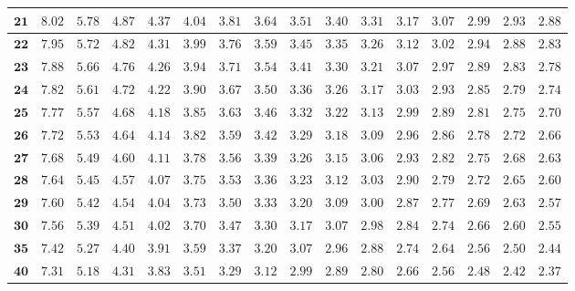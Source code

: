 \begin{alternateColorTable}
\begin{longtable}{|r|r|r|r|r|r|r|r|r|r|r|r|r|r|r|r|}
    \(\mathbf{21}\) & \(8.02\) & \(5.78\) & \(4.87\) & \(4.37\) & \(4.04\) & \(3.81\) & \(3.64\) & \(3.51\) & \(3.40\) & \(3.31\) & \(3.17\) & \(3.07\) & \(2.99\) & \(2.93\) & \(2.88\) \\ \hline 
    \(\mathbf{22}\) & \(7.95\) & \(5.72\) & \(4.82\) & \(4.31\) & \(3.99\) & \(3.76\) & \(3.59\) & \(3.45\) & \(3.35\) & \(3.26\) & \(3.12\) & \(3.02\) & \(2.94\) & \(2.88\) & \(2.83\) \\ \hline 
    \(\mathbf{23}\) & \(7.88\) & \(5.66\) & \(4.76\) & \(4.26\) & \(3.94\) & \(3.71\) & \(3.54\) & \(3.41\) & \(3.30\) & \(3.21\) & \(3.07\) & \(2.97\) & \(2.89\) & \(2.83\) & \(2.78\) \\ \hline 
    \(\mathbf{24}\) & \(7.82\) & \(5.61\) & \(4.72\) & \(4.22\) & \(3.90\) & \(3.67\) & \(3.50\) & \(3.36\) & \(3.26\) & \(3.17\) & \(3.03\) & \(2.93\) & \(2.85\) & \(2.79\) & \(2.74\) \\ \hline 
    \(\mathbf{25}\) & \(7.77\) & \(5.57\) & \(4.68\) & \(4.18\) & \(3.85\) & \(3.63\) & \(3.46\) & \(3.32\) & \(3.22\) & \(3.13\) & \(2.99\) & \(2.89\) & \(2.81\) & \(2.75\) & \(2.70\) \\ \hline 
    \(\mathbf{26}\) & \(7.72\) & \(5.53\) & \(4.64\) & \(4.14\) & \(3.82\) & \(3.59\) & \(3.42\) & \(3.29\) & \(3.18\) & \(3.09\) & \(2.96\) & \(2.86\) & \(2.78\) & \(2.72\) & \(2.66\) \\ \hline 
    \(\mathbf{27}\) & \(7.68\) & \(5.49\) & \(4.60\) & \(4.11\) & \(3.78\) & \(3.56\) & \(3.39\) & \(3.26\) & \(3.15\) & \(3.06\) & \(2.93\) & \(2.82\) & \(2.75\) & \(2.68\) & \(2.63\) \\ \hline 
    \(\mathbf{28}\) & \(7.64\) & \(5.45\) & \(4.57\) & \(4.07\) & \(3.75\) & \(3.53\) & \(3.36\) & \(3.23\) & \(3.12\) & \(3.03\) & \(2.90\) & \(2.79\) & \(2.72\) & \(2.65\) & \(2.60\) \\ \hline 
    \(\mathbf{29}\) & \(7.60\) & \(5.42\) & \(4.54\) & \(4.04\) & \(3.73\) & \(3.50\) & \(3.33\) & \(3.20\) & \(3.09\) & \(3.00\) & \(2.87\) & \(2.77\) & \(2.69\) & \(2.63\) & \(2.57\) \\ \hline 
    \(\mathbf{30}\) & \(7.56\) & \(5.39\) & \(4.51\) & \(4.02\) & \(3.70\) & \(3.47\) & \(3.30\) & \(3.17\) & \(3.07\) & \(2.98\) & \(2.84\) & \(2.74\) & \(2.66\) & \(2.60\) & \(2.55\) \\ \hline 
    \(\mathbf{35}\) & \(7.42\) & \(5.27\) & \(4.40\) & \(3.91\) & \(3.59\) & \(3.37\) & \(3.20\) & \(3.07\) & \(2.96\) & \(2.88\) & \(2.74\) & \(2.64\) & \(2.56\) & \(2.50\) & \(2.44\) \\ \hline 
    \(\mathbf{40}\) & \(7.31\) & \(5.18\) & \(4.31\) & \(3.83\) & \(3.51\) & \(3.29\) & \(3.12\) & \(2.99\) & \(2.89\) & \(2.80\) & \(2.66\) & \(2.56\) & \(2.48\) & \(2.42\) & \(2.37\) \\ \hline 

\end{longtable}
\end{alternateColorTable}

